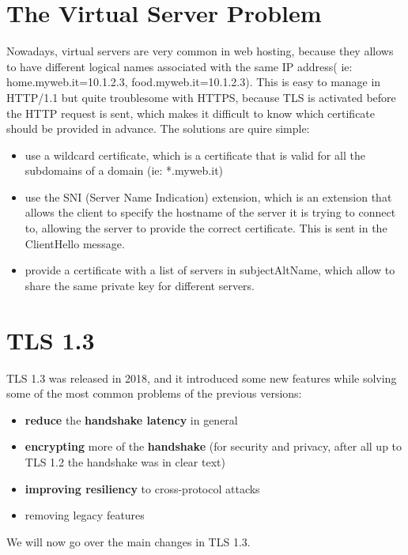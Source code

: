 \section{The Virtual Server Problem}
Nowadays, virtual servers are very common in web hosting, because they
allows to have different logical names associated with the same IP
address( ie: home.myweb.it=10.1.2.3, food.myweb.it=10.1.2.3).
This is easy to manage in HTTP/1.1 but quite troublesome with HTTPS,
because TLS is activated before the HTTP request is sent, which makes
it difficult to know which certificate should be provided in advance.
The solutions are quire simple:
\begin{itemize}
  \item use a wildcard certificate, which is a certificate that is
    valid for all the subdomains of a domain (ie: *.myweb.it)
  \item use the SNI (Server Name Indication) extension, which is an
    extension that allows the client to specify the hostname of the
    server it is trying to connect to, allowing the server to provide
    the correct certificate. This is sent in the ClientHello message.
  \item provide a certificate with a list of servers in
    subjectAltName, which allow to share the same private key for 
    different servers.
\end{itemize}

\section{TLS 1.3}
TLS 1.3 was released in 2018, and it introduced some new features
while solving some of the most common problems of the previous 
versions:
\begin{itemize}
  \item \textbf{reduce} the \textbf{handshake latency} in general 
  \item \textbf{encrypting} more of the \textbf{handshake} (for
    security and privacy, after all up to TLS 1.2 the handshake was in
    clear text)
  \item \textbf{improving resiliency} to cross-protocol attacks
  \item removing legacy features
\end{itemize}
We will now go over the main changes in TLS 1.3.

